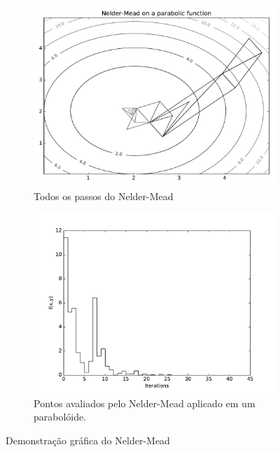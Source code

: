 \begin{figure}
\centering
\begin{subfigure}{.5\textwidth}
  \centering
  \includegraphics[width=\linewidth]{figs/neldermeadsimplex.pdf}
  \caption{Todos os passos do Nelder-Mead}
  \label{fig:sub1}
\end{subfigure}%
\begin{subfigure}{.5\textwidth}
  \centering
  \includegraphics[width=\linewidth]{figs/neldermeadconvergence.pdf}
  \caption{Pontos avaliados pelo Nelder-Mead aplicado em um parabolóide.}
  \label{fig:sub2}
\end{subfigure}
\caption{Demonstração gráfica do Nelder-Mead}
\label{fig:neldermead}
\end{figure}




